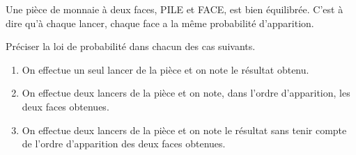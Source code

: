 \begin{exercice}
     Une pièce de monnaie à deux faces, PILE et FACE, est bien équilibrée. C'est 
 à dire qu'à chaque lancer, chaque face a la même probabilité
 d'apparition.
 
     Préciser la loi de probabilité dans chacun des cas suivants.
     \begin{enumerate}
         \item On effectue un seul lancer de la pièce et on note le résultat 
 obtenu.
         \item On effectue deux lancers de la pièce et on note, dans l'ordre 
 d'apparition, les deux faces obtenues.
         \item On effectue deux lancers de la pièce et on note le résultat sans 
 tenir compte de l'ordre d'apparition des deux faces obtenues.
     \end{enumerate}
 \end{exercice}
 
